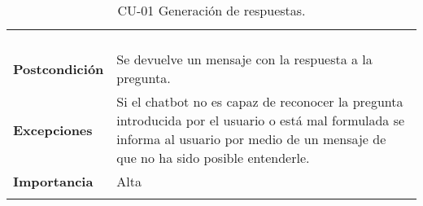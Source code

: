 \begin{longtable}[H]{@{}ll@{}}
\begin{minipage}[t]{0.71\columnwidth}
\begin{enumerate}
		\end{enumerate}\strut
	\end{minipage}\tabularnewline
	\begin{minipage}[t]{0.23\columnwidth}\raggedright\strut
		\textbf{Postcondición}\strut
	\end{minipage} & \begin{minipage}[t]{0.71\columnwidth}\raggedright\strut
		Se devuelve un mensaje con la respuesta a la pregunta.\strut
	\end{minipage}\tabularnewline
	\begin{minipage}[t]{0.23\columnwidth}\raggedright\strut
		\textbf{Excepciones}\strut
	\end{minipage} & \begin{minipage}[t]{0.71\columnwidth}\raggedright\strut
		Si el chatbot no es capaz de reconocer la pregunta introducida por el usuario o está mal formulada se informa al usuario por medio de un mensaje de que no ha sido posible entenderle.\strut
	\end{minipage}\tabularnewline
	\begin{minipage}[t]{0.23\columnwidth}\raggedright\strut
		\textbf{Importancia}\strut
	\end{minipage} & \begin{minipage}[t]{0.71\columnwidth}\raggedright\strut
		Alta\strut
	\end{minipage}\tabularnewline
	\bottomrule
	\caption{CU-01 Generación de respuestas.}
\end{longtable}

